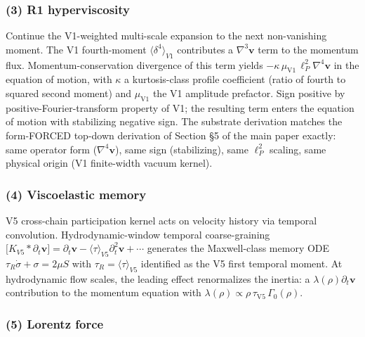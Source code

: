 \documentclass[
  11pt,a4paper]{article}
\begin{document}
\subsubsection{(3) R1 hyperviscosity}\label{r1-hyperviscosity}

Continue the V1-weighted multi-scale expansion to the next non-vanishing
moment. The V1 fourth-moment \(\bigl\langle\delta^4\bigr\rangle_{V1}\)
contributes a \(\nabla^3\mathbf{v}\) term to the momentum flux.
Momentum-conservation divergence of this term yields
\(-\kappa\,\mu_\mathrm{V1}\,\ell_P^2\nabla^4\mathbf{v}\) in the equation
of motion, with \(\kappa\) a kurtosis-class profile coefficient (ratio
of fourth to squared second moment) and \(\mu_\mathrm{V1}\) the V1
amplitude prefactor. Sign positive by positive-Fourier-transform
property of V1; the resulting term enters the equation of motion with
stabilizing negative sign. The substrate derivation matches the
form-FORCED top-down derivation of Section §5 of the main paper exactly:
same operator form (\(\nabla^4\mathbf{v}\)), same sign (stabilizing),
same \(\ell_P^2\) scaling, same physical origin (V1 finite-width vacuum
kernel).

\subsubsection{(4) Viscoelastic memory}\label{viscoelastic-memory}

V5 cross-chain participation kernel acts on velocity history via
temporal convolution. Hydrodynamic-window temporal coarse-graining
\(\bigl[K_{V5}\ast\partial_t\mathbf{v}\bigr] = \partial_t\mathbf{v} - \bigl\langle\tau\bigr\rangle_{V5}\partial_t^2\mathbf{v} + \cdots\)
generates the Maxwell-class memory ODE
\(\tau_R\dot\sigma + \sigma = 2\mu S\) with
\(\tau_R = \bigl\langle\tau\bigr\rangle_{V5}\) identified as the V5
first temporal moment. At hydrodynamic flow scales, the leading effect
renormalizes the inertia: a \(\lambda(\rho)\partial_t\mathbf{v}\)
contribution to the momentum equation with
\(\lambda(\rho) \propto \rho\,\tau_\mathrm{V5}\,\Gamma_0(\rho)\).

\subsubsection{(5) Lorentz force}\label{lorentz-force}
\end{document}
